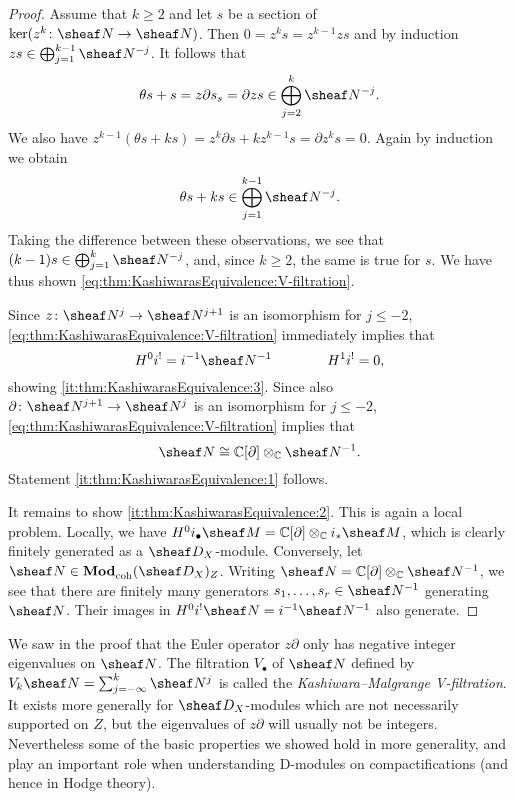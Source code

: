 \documentclass[number-in-sections,a4paper]{notes}
\begin{document}
\begin{proof}
    Assume that $k \ge 2$ and let $s$ be a section of $\ker (z^k\colon \sheaf N \to \sheaf N)$.
    Then $0 = z^ks = z^{k-1}zs$ and by induction $zs \in  \bigoplus_{j=1}^{k-1} \sheaf N^{-j}$.
    It follows that 
    \[
        \theta s + s = z\partial s _ s = \partial z s \in \bigoplus_{j=2}^{k} \sheaf N^{-j}.
    \]
    We also have $z^{k-1}(\theta s + ks) = z^k \partial s +kz^{k-1}s = \partial z^k s = 0$.
    Again by induction we obtain
    \[
        \theta s + ks \in \bigoplus_{j=1}^{k-1} \sheaf N^{-j}.
    \]
    Taking the difference between these observations, we see that $(k-1)s \in \bigoplus_{j=1}^{k} \sheaf N^{-j}$, and, since $k \ge 2$, the same is true for $s$.
    We have thus shown \eqref{eq:thm:KashiwarasEquivalence:V-filtration}.

    Since $z\colon \sheaf N^j \to \sheaf N^{j+1}$ is an isomorphism for $j \le -2$, \eqref{eq:thm:KashiwarasEquivalence:V-filtration} immediately implies that
    \[
        H^0i^! = i^{-1}\sheaf N^{-1}
        \qquad\text\qquad
        H^1i^! = 0,
    \]
    showing \ref{it:thm:KashiwarasEquivalence:3}.
    Since also $\partial\colon \sheaf N^{j+1} \to \sheaf N^{j}$ is an isomorphism for $j \le -2$, \eqref{eq:thm:KashiwarasEquivalence:V-filtration} implies that
    \[
        \sheaf N \cong \CC[\partial] \otimes_{\CC} \sheaf N^{-1}.
    \]
    Statement \ref{it:thm:KashiwarasEquivalence:1} follows.

    It remains to show \ref{it:thm:KashiwarasEquivalence:2}.
    This is again a local problem.
    Locally, we have $H^0i_\bullet \sheaf M = \CC[\partial] \otimes_{\CC} i_*\sheaf M$, which is clearly finitely generated as a $\sD_X$-module.
    Conversely, let $\sheaf N \in \catDModcoh{X}_Z$.
    Writing $\sheaf N = \CC[\partial] \otimes_\CC \sheaf N^{-1}$, we see that there are finitely many generators $s_1,\dotsc,s_r \in \sheaf N^{-1}$ generating $\sheaf N$.
    Their images in $H^0i^!\sheaf N = i^{-1}\sheaf N^{-1}$ also generate.
\end{proof}

\begin{Remark}
    We saw in the proof that the Euler operator $z\partial$ only has negative integer eigenvalues on $\sheaf N$.
    The filtration $V_\bullet$ of $\sheaf N$ defined by $V_k\sheaf N = \sum_{j=-\infty}^k \sheaf N^j$ is called the \emph{Kashiwara--Malgrange V-filtration}.
    It exists more generally for $\sD_X$-modules which are not necessarily supported on $Z$, but the eigenvalues of $z\partial$ will usually not be integers.
    Nevertheless some of the basic properties we showed hold in more generality, and play an important role when understanding D-modules on compactifications (and hence in Hodge theory).
\end{Remark}
\end{document}
